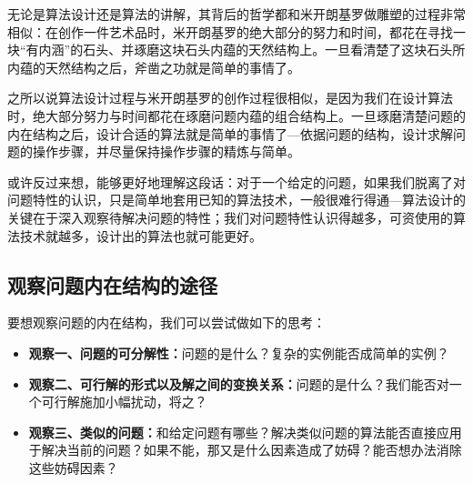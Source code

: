 {\kaishu  无论是算法设计还是算法的讲解，其背后的哲学都和米开朗基罗做雕塑的过程非常相似：在创作一件艺术品时，米开朗基罗的绝大部分的努力和时间，都花在寻找一块“有内涵”的石头、并琢磨这块石头内蕴的天然结构上。一旦看清楚了这块石头所内蕴的天然结构之后，斧凿之功就是简单的事情了。

  之所以说算法设计过程与米开朗基罗的创作过程很相似，是因为我们在设计算法时，绝大部分努力与时间都花在琢磨问题内蕴的组合结构上。一旦琢磨清楚问题的内在结构之后，设计合适的算法就是简单的事情了---依据问题的结构，设计求解问题的操作步骤，并尽量保持操作步骤的精炼与简单。
}

         或许反过来想，能够更好地理解这段话：对于一个给定的问题，如果我们脱离了对问题特性的认识，只是简单地套用已知的算法技术，一般很难行得通---算法设计的关键在于深入观察待解决问题的特性；我们对问题特性认识得越多，可资使用的算法技术就越多，设计出的算法也就可能更好。

\subsection{观察问题内在结构的途径}
	要想观察问题的内在结构，我们可以尝试做如下的思考：
	\begin{itemize}
		\item {\bf 观察一、问题的可分解性：}问题的是什么？复杂的实例能否成简单的实例？
		\item {\bf 观察二、可行解的形式以及解之间的变换关系：}问题的是什么？我们能否对一个可行解施加小幅扰动，将之？
		\item {\bf 观察三、类似的问题：}和给定问题有哪些？解决类似问题的算法能否直接应用于解决当前的问题？如果不能，那又是什么因素造成了妨碍？能否想办法消除这些妨碍因素？
	\end{itemize}
	
